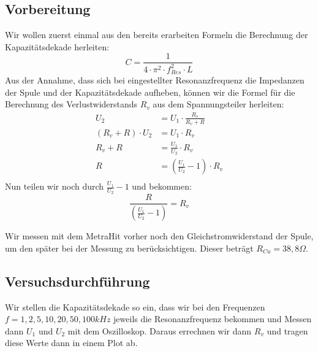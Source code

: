 \documentclass{article}
\begin{document}
\subsection{Vorbereitung}

Wir wollen zuerst einmal aus den bereits erarbeiten Formeln die Berechnung der Kapazitätsdekade herleiten:
\begin{equation}
  C = \frac{1}{4\cdot\pi^2\cdot f_{Res}^2 \cdot L}
\end{equation}
Aus der Annahme, dass sich bei eingestellter Resonanzfrequenz die Impedanzen der Spule und der Kapazitätsdekade aufheben, können wir die Formel
für die Berechnung des Verlustwiderstands $R_v$ aus dem Spannungsteiler herleiten:
\begin{align*}
  U_2                           & = U_1 \cdot \frac{R_v}{R_v+R}                \\
  \left(R_v + R\right)\cdot U_2 & = U_1 \cdot R_v                              \\
  R_v + R                       & = \frac{U_1}{U_2} \cdot R_v                  \\
  R                             & = \left(\frac{U_1}{U_2} - 1\right) \cdot R_v \\
\end{align*}
Nun teilen wir noch durch $\frac{U_1}{U_2} - 1$ und bekommen:
\begin{equation}
  \frac{R}{\left(\frac{U_1}{U_2} - 1\right)}  = R_v
\end{equation}

Wir messen mit dem MetraHit vorher noch den Gleichstromwiderstand der Spule, um den später bei der Messung zu berücksichtigen.
Dieser beträgt $R_{Cu} = 38,8\Omega$.

\subsection{Versuchsdurchführung}

Wir stellen die Kapazitätsdekade so ein, dass wir bei den Frequenzen $f = 1,2,5,10,20,50,100kHz$ jeweils die Resonanzfrequenz bekommen und Messen dann
$U_1$ und $U_2$ mit dem Oszilloskop. Daraus errechnen wir dann $R_v$ und tragen diese Werte dann in einem Plot ab.
\end{document}
